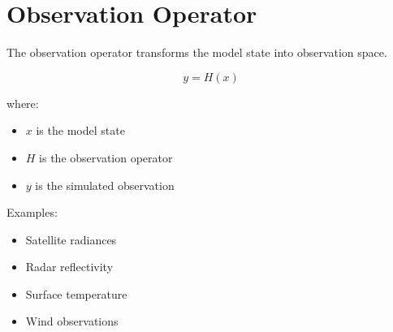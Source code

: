 \section{Observation Operator}


The observation operator transforms the model state into
observation space.


\begin{equation}
y=H(x)
\end{equation}


where:


\begin{itemize}

\item $x$ is the model state

\item $H$ is the observation operator

\item $y$ is the simulated observation

\end{itemize}



Examples:


\begin{itemize}

\item Satellite radiances

\item Radar reflectivity

\item Surface temperature

\item Wind observations

\end{itemize}
